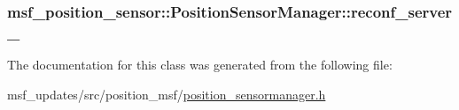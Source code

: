 \hypertarget{classmsf__position__sensor_1_1PositionSensorManager_a722e3be8a48e1ac92050679569442a12}{
\subsubsection[{reconf\-\_\-server\-\_\-}]{ msf\-\_\-position\-\_\-sensor\-::\-Position\-Sensor\-Manager\-::reconf\-\_\-server\-\_\-\hspace{0.3cm}{\ttfamily [private]}}}\label{classmsf__position__sensor_1_1PositionSensorManager_a722e3be8a48e1ac92050679569442a12}


The documentation for this class was generated from the following file\-:\begin{DoxyCompactItemize}
\item 
msf\-\_\-updates/src/position\-\_\-msf/\hyperlink{position__sensormanager_8h}{position\-\_\-sensormanager.\-h}\end{DoxyCompactItemize}
